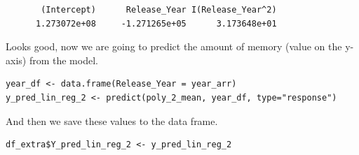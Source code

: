 \documentclass[a4paper]{article}
\begin{document}
\begin{lstlisting}
       (Intercept)      Release_Year I(Release_Year^2) 
      1.273072e+08     -1.271265e+05      3.173648e+01 
\end{lstlisting}
Looks good, now we are going to predict the amount of memory (value on the y-axis) from the model.
\begin{mdframed}[leftline=false,rightline=false,backgroundcolor=lightblue!10,nobreak=false]
    \begin{verbatim}
year_df <- data.frame(Release_Year = year_arr)
y_pred_lin_reg_2 <- predict(poly_2_mean, year_df, type="response")
    \end{verbatim}
\end{mdframed}
And then we save these values to the data frame.
\begin{mdframed}[leftline=false,rightline=false,backgroundcolor=lightblue!10,nobreak=false]
    \begin{verbatim}
df_extra$Y_pred_lin_reg_2 <- y_pred_lin_reg_2
    \end{verbatim}
\end{mdframed}
\end{document}
